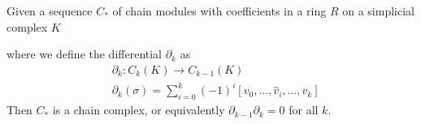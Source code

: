 \begin{theorem}\label{simpchainthm}
Given a sequence $C_{*}$ of chain modules with coefficients in a ring $R$ on a simplicial complex $K$
\begin{center}
\end{center}
where we define the differential $\partial_{k}$ as
\begin{align*}
& \partial_{k}:  C_{k}(K) \to C_{k-1}(K) \\
& \partial_{k}(\sigma) =  \sum^{k}_{{i=0}} (-1)^{i} [v_{0},\dots,\hat v_{i}, \dots, v_{k}]
\end{align*}
Then $C_{*}$ is a chain complex, or equivalently $\partial_{k-1}\partial_{k}=0$ for all $k$.
\end{theorem}

